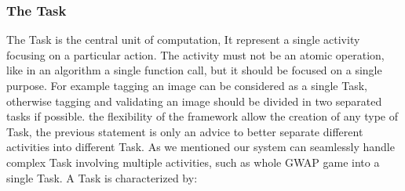 \subsubsection{The Task}\label{data:task}
The Task is the central unit of computation, It represent a single activity
focusing on a particular action. The activity must not be an atomic operation,
like in an algorithm a single function call, but it should be focused on a
single purpose. For example tagging an image can be considered as a single Task,
otherwise tagging and validating an image should be divided in two separated
tasks if possible. the flexibility of the framework allow the creation of any
type of Task, the previous statement is only an advice to better separate
different activities into different Task. As we mentioned our system can
seamlessly handle complex Task involving multiple activities, such as whole
\ac{GWAP} game into a single Task. A Task is characterized by:
